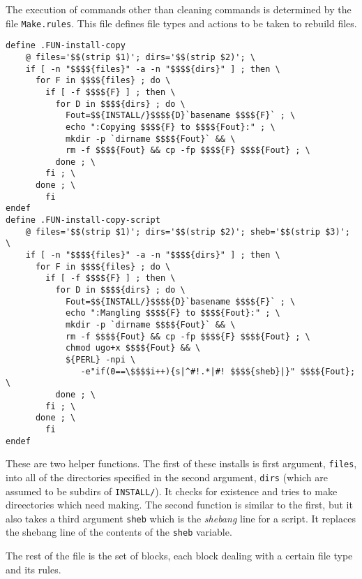 \documentclass[letterpaper]{article}
\begin{document}
The execution of commands other than cleaning commands is
determined by the file \verb+Make.rules+.  This file defines
file types and actions to be taken to rebuild files.

\begin{verbatim}
define .FUN-install-copy
	@ files='$$(strip $1)'; dirs='$$(strip $2)'; \
	if [ -n "$$$${files}" -a -n "$$$${dirs}" ] ; then \
	  for F in $$$${files} ; do \
	    if [ -f $$$${F} ] ; then \
	      for D in $$$${dirs} ; do \
	        Fout=$${INSTALL/}$$$${D}`basename $$$${F}` ; \
	        echo ":Copying $$$${F} to $$$${Fout}:" ; \
	        mkdir -p `dirname $$$${Fout}` && \
	        rm -f $$$${Fout} && cp -fp $$$${F} $$$${Fout} ; \
	      done ; \
	    fi ; \
	  done ; \
        fi
endef
define .FUN-install-copy-script
	@ files='$$(strip $1)'; dirs='$$(strip $2)'; sheb='$$(strip $3)'; \
	if [ -n "$$$${files}" -a -n "$$$${dirs}" ] ; then \
	  for F in $$$${files} ; do \
	    if [ -f $$$${F} ] ; then \
	      for D in $$$${dirs} ; do \
	        Fout=$${INSTALL/}$$$${D}`basename $$$${F}` ; \
	        echo ":Mangling $$$${F} to $$$${Fout}:" ; \
	        mkdir -p `dirname $$$${Fout}` && \
	        rm -f $$$${Fout} && cp -fp $$$${F} $$$${Fout} ; \
	        chmod ugo+x $$$${Fout} && \
	        ${PERL} -npi \
	           -e"if(0==\$$$$i++){s|^#!.*|#! $$$${sheb}|}" $$$${Fout}; \
	      done ; \
	    fi ; \
	  done ; \
        fi
endef
\end{verbatim}
These are two helper functions.  The first of these installs is first
argument, \verb+files+, into all of the directories specified in the
second argument, \verb+dirs+ (which are assumed to be subdirs of
\verb+INSTALL/+).  It checks for existence and tries to make
direectories which need making.  The second function is similar to the
first, but it also takes a third argument \verb+sheb+ which is the
{\em shebang} line for a script.  It replaces the shebang line of the
contents of the \verb+sheb+ variable.

The rest of the file is the set of blocks, each block dealing with
a certain file type and its rules.
\end{document}
